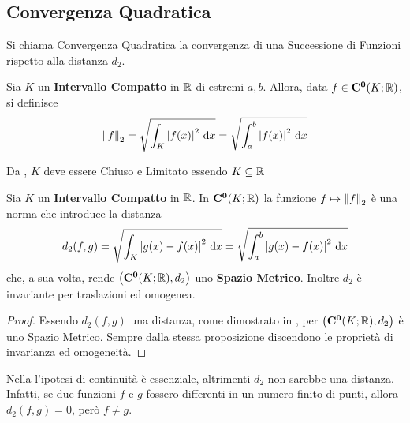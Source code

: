 \subsection{Convergenza Quadratica}\label{sect:conv_quadr}
Si chiama Convergenza Quadratica la convergenza di una Successione di Funzioni rispetto alla distanza $d_2$.
\begin{definition}
	Sia $K$ un \textbf{Intervallo Compatto} in $\mathbb{R}$ di estremi $a, b$. Allora, data $f \in \mathbf{C^{0}}(K; \mathbb{R})$, si definisce
	\[\left\|f\right\|_2 = \sqrt{\int_{K} \left|f(x)\right|^2 \,\mathrm{d}{x}} = \sqrt{\int_{a}^{b} \left|f(x)\right|^2 \,\mathrm{d}{x}}\]
	\begin{note}
		Da , $K$ deve essere Chiuso e Limitato essendo $K \subseteq \mathbb{R}$
	\end{note}
\end{definition}
\begin{proposition}
	\label{def:dist_quadratica}
	Sia $K$ un \textbf{Intervallo Compatto} in $\mathbb{R}$. In $\mathbf{C^{0}}(K; \mathbb{R})$ la funzione $f \mapsto \left\|f\right\|_2$ è una norma che introduce la distanza
	\[d_2(f, g) = \sqrt{\int_{K} \left|g(x) - f(x)\right|^2 \,\mathrm{d}{x}} = \sqrt{\int_{a}^{b} \left|g(x) - f(x)\right|^2 \,\mathrm{d}{x}}\]
	che, a sua volta, rende $\bigl( \mathbf{C^{0}}(K; \mathbb{R}), d_2 \bigr)$ uno \textbf{Spazio Metrico}. Inoltre $d_2$ è invariante per traslazioni ed omogenea.

	\begin{proof}
		Essendo $d_2(f,g)$ una distanza, come dimostrato in \hyperref[ex:dim_dist_quadratica]{},
		per  $\bigl( \mathbf{C^{0}}(K; \mathbb{R}), d_2 \bigr)$ è uno Spazio Metrico. Sempre dalla stessa proposizione discendono le proprietà di invarianza ed omogeneità.
	\end{proof}
\end{proposition}
\begin{example}
	\label{ex:d2_deve_essere_di_f_C0}
	Nella  l'ipotesi di continuità è essenziale, altrimenti $d_2$ non sarebbe una distanza.\\
	Infatti, se due funzioni $f$ e $g$ fossero differenti in un numero finito di punti, allora $d_2(f,g) = 0$, però $f \neq g$.
\end{example}
